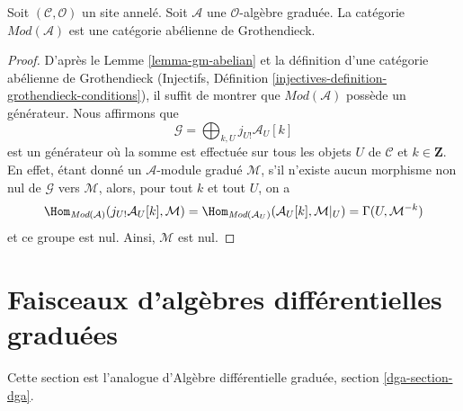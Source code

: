 \begin{lemma}
\label{lemma-gm-grothendieck-abelian}
Soit $(\mathcal{C}, \mathcal{O})$ un site annelé.
Soit $\mathcal{A}$ une $\mathcal{O}$-algèbre graduée.
La catégorie $\textit{Mod}(\mathcal{A})$ est une catégorie abélienne de Grothendieck.
\end{lemma}

\begin{proof}
D'après le Lemme \ref{lemma-gm-abelian}  et la définition d'une catégorie abélienne de Grothendieck (Injectifs, Définition \ref{injectives-definition-grothendieck-conditions}), il suffit de montrer que $\textit{Mod}(\mathcal{A})$ possède un générateur.
Nous affirmons que
$$
\mathcal{G} = \bigoplus\nolimits_{k, U} j_{U!}\mathcal{A}_U[k]
$$
est un générateur où la somme est effectuée sur tous les objets $U$ de $\mathcal{C}$ et $k \in \mathbf{Z}$.
En effet, étant donné un $\mathcal{A}$-module gradué $\mathcal{M}$, s'il n'existe aucun morphisme non nul de $\mathcal{G}$ vers $\mathcal{M}$, alors, pour tout $k$ et tout $U$, on a
$$
\Hom_{\textit{Mod}(\mathcal{A})}(j_{U!}\mathcal{A}_U[k], \mathcal{M}) =
\Hom_{\textit{Mod}(\mathcal{A}_U)}(\mathcal{A}_U[k], \mathcal{M}|_U) =
\Gamma(U, \mathcal{M}^{-k})
$$
et ce groupe est nul.
Ainsi, $\mathcal{M}$ est nul.
\end{proof}









\section{Faisceaux d'algèbres différentielles graduées}
\label{section-dga}

\noindent
Cette section est l'analogue d'Algèbre différentielle graduée, section \ref{dga-section-dga}.

